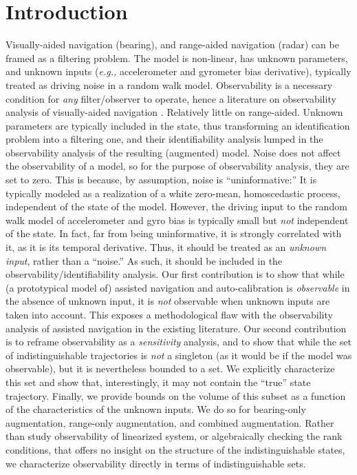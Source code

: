 \section{Introduction}
Visually-aided navigation (bearing), and range-aided navigation (radar) can be framed as a filtering problem. The model is non-linear, has unknown parameters, and unknown inputs ({\em e.g.,} accelerometer and gyrometer bias derivative), typically treated as driving noise in a random walk model.
Observability is a necessary condition for {\em any} filter/observer to operate, hence a literature on observability analysis of visually-aided navigation \cite{kellyS09,mourikisR07,jonesS07}. Relatively little on range-aided. 
Unknown parameters are typically included in the state, thus transforming an identification problem into a filtering one, and their identifiability analysis lumped in the observability analysis of the resulting (augmented) model.
Noise does not affect the observability of a model, so for the purpose of observability analysis, they are set to zero. This is because, by assumption, noise is ``uninformative:'' It is typically modeled as a realization of a white zero-mean, homoscedastic process, independent of the state of the model.
However, the driving input to the random walk model of accelerometer and gyro bias is typically small but {\em not} independent of the state. In fact, far from being uninformative, it is strongly correlated with it, as it is its temporal derivative. Thus, it should be treated as an {\em unknown input}, rather than a ``noise.'' As such, it should be included in the observability/identifiability analysis. 
Our first contribution is to show that while (a prototypical model of) assisted navigation and auto-calibration is {\em observable} in the absence of unknown input, it is {\em not} observable when unknown inputs are taken into account. This exposes a methodological flaw with the observability analysis of assisted navigation in the existing literature.
Our second contribution is to reframe observability as a {\em sensitivity} analysis, and to show that while the set of indistinguishable trajectories is {\em not} a singleton (as it would be if the model was observable), but it is nevertheless bounded to a set. We explicitly characterize this set and show that, interestingly, it may not contain the ``true'' state trajectory. Finally, we provide bounds on the volume of this subset as a function of the characteristics of the unknown inputs.
We do so for bearing-only augmentation, range-only augmentation, and combined augmentation.
Rather than study observability of linearized system, or algebraically checking the rank conditions, that offers no insight on the structure of the indistinguishable states, we characterize observability directly in terms of indistinguishable sets.

